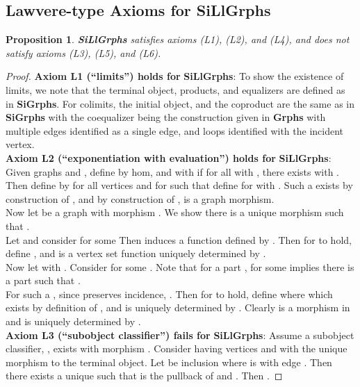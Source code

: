 \documentclass[11pt]{article}
\newtheorem{proposition}[theorem]{Proposition}
\begin{document}
\subsection{Lawvere-type Axioms for \textbf{SiLlGrphs}}
\begin{proposition}
\textbf{SiLlGrphs} satisfies axioms (L1), (L2), and (L4), and does not satisfy axioms (L3), (L5), and (L6).
\end{proposition}
\begin{proof}
\textbf{Axiom L1 (``limits'') holds for} \textbf{SiLlGrphs}: To show the existence of limits, we note that the terminal object, products, and equalizers are defined as in \textbf{SiGrphs}. For colimits, the initial object, and the coproduct are the same as in \textbf{SiGrphs} with the coequalizer being the construction given in \textbf{Grphs} with multiple edges identified as a single edge, and loops identified with the incident vertex.\\
\indent \textbf{Axiom L2 (``exponentiation with evaluation'') holds for} \textbf{SiLlGrphs}: Given graphs  and , define  by  hom, and  with \textunderscore if for all  with \textunderscore, there exists  with \textunderscore.\\
\indent Then define  by  for all vertices  and for  such that \textunderscore define  for  with \textunderscore. Such a  exists by construction of , and by construction of ,  is a graph morphism.\\
\indent Now let  be a graph with morphism . We show there is a unique morphism  such that .\\
\indent Let  and consider  for some  Then  induces a function  defined by . Then for  to hold, define , and  is a vertex set function uniquely determined by .\\
\indent Now let  with \textunderscore. Consider \textunderscore for some . Note that for a part , \textunderscore for some  implies there is a part  such that \textunderscore.\\
\indent For such a , since  preserves incidence, \textunderscore\textunderscore.
Then for  to hold, define  where \textunderscore which exists by definition of , and is uniquely determined by . Clearly  is a morphism in  and is uniquely determined by .\\
\indent \textbf{Axiom L3 (``subobject classifier'') fails for} \textbf{SiLlGrphs}: 
Assume a subobject classifier, , exists with morphism . Consider  having vertices  and  with  the unique morphism to the terminal object. Let  be inclusion where  is   with edge . Then there exists a unique  such that  is the pullback of  and . Then .

\end{proof}
\end{document}
